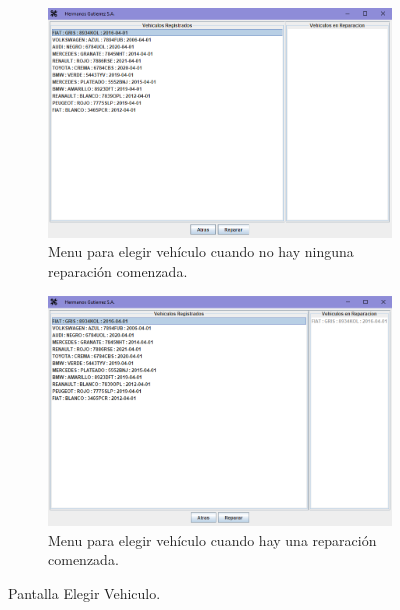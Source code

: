 \documentclass{article}
\begin{document}
  \begin{figure}[H]
    \centering
    \begin{subfigure}{.5\textwidth}
      \centering
      \includegraphics[width=0.9\linewidth]{program/capturasEjec/menuElegirVehiculo.PNG}
      \caption{Menu para elegir vehículo cuando no hay ninguna reparación comenzada.}
    \end{subfigure}%
    \begin{subfigure}{.5\textwidth}
      \centering
      \includegraphics[width=0.9\linewidth]{program/capturasEjec/menuElegirVehiculo2.PNG}
      \caption{Menu para elegir vehículo cuando hay una reparación comenzada.}
    \end{subfigure}
    \caption{Pantalla Elegir Vehiculo.}
  \end{figure}
\end{document}
